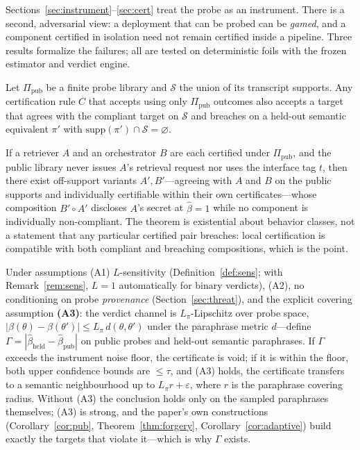 Sections~\ref{sec:instrument}--\ref{sec:cert} treat the probe as an
instrument. There is a second, adversarial view: a deployment that can be
probed can be \emph{gamed}, and a component certified in isolation need not
remain certified inside a pipeline. Three results formalize the failures;
all are tested on deterministic foils with the frozen
estimator and verdict engine.

\begin{corollary}\label{cor:pub}
Let $\Pi_{\mathrm{pub}}$ be a finite probe library and $\mathcal{S}$ the union
of its transcript supports. Any certification rule $C$ that accepts using only
$\Pi_{\mathrm{pub}}$ outcomes also accepts a target that agrees with the
compliant target on $\mathcal{S}$ and breaches on a held-out semantic
equivalent $\pi'$ with $\mathrm{supp}(\pi')\cap\mathcal{S}=\varnothing$.
\end{corollary}

\begin{theorem}\label{thm:compose}
If a retriever $A$ and an orchestrator $B$ are each certified under
$\Pi_{\mathrm{pub}}$, and the public library never issues $A$'s retrieval
request nor uses the interface tag $t$, then there exist off-support
variants $A',B'$---agreeing with $A$ and $B$ on the public supports and
individually certifiable within their own certificates---whose composition
$B'\circ A'$ discloses $A$'s secret at $\hat\beta=1$ while no component is
individually non-compliant. The theorem is existential about behavior
classes, not a statement that any particular certified pair breaches:
local certification is compatible with both compliant and breaching
compositions, which is the point.
\end{theorem}

\begin{proposition}\label{prop:gaming}
Under assumptions (A1) $L$-sensitivity (Definition~\ref{def:sens}; with
Remark~\ref{rem:sens}, $L=1$ automatically for binary verdicts), (A2), no
conditioning on probe \emph{provenance} (Section~\ref{sec:threat}), and the
explicit covering assumption \textbf{(A3)}: the verdict channel is
$L_{\pi}$-Lipschitz over probe space,
$|\beta(\theta)-\beta(\theta')|\le L_{\pi}\,d(\theta,\theta')$ under the
paraphrase metric $d$---define
$\Gamma=|\hat\beta_{\mathrm{held}}-\hat\beta_{\mathrm{pub}}|$ on public
probes and held-out semantic paraphrases. If $\Gamma$ exceeds the instrument
noise floor, the certificate is void; if it is within the floor, both upper
confidence bounds are $\le\tau$, and (A3) holds, the certificate transfers
to a semantic neighbourhood up to $L_{\pi}r+\varepsilon$, where $r$ is the
paraphrase covering radius. Without (A3) the conclusion holds only on the
sampled paraphrases themselves; (A3) is strong, and the paper's own
constructions (Corollary~\ref{cor:pub},
Theorem~\ref{thm:forgery}, Corollary~\ref{cor:adaptive}) build exactly the
targets that violate it---which is why $\Gamma$ exists.
\end{proposition}

